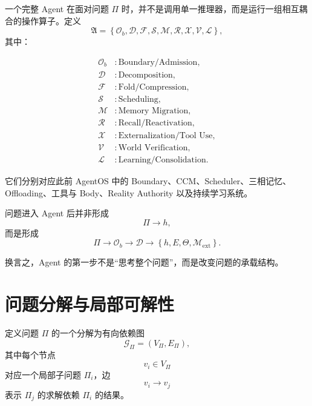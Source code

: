 一个完整 Agent 在面对问题 $\Pi$ 时，并不是调用单一推理器，而是运行一组相互耦合的操作算子。定义
\begin{equation}
\mathfrak A
=
\left\{
\mathcal O_b,
\mathcal D,
\mathcal F,
\mathcal S,
\mathcal M,
\mathcal R,
\mathcal X,
\mathcal V,
\mathcal L
\right\},
\end{equation}
其中：

\begin{align}
\mathcal O_b &: \text{Boundary/Admission},\\
\mathcal D &: \text{Decomposition},\\
\mathcal F &: \text{Fold/Compression},\\
\mathcal S &: \text{Scheduling},\\
\mathcal M &: \text{Memory Migration},\\
\mathcal R &: \text{Recall/Reactivation},\\
\mathcal X &: \text{Externalization/Tool Use},\\
\mathcal V &: \text{World Verification},\\
\mathcal L &: \text{Learning/Consolidation}.
\end{align}

它们分别对应此前 AgentOS 中的 Boundary、CCM、Scheduler、三相记忆、Offloading、工具与 Body、Reality Authority 以及持续学习系统。

问题进入 Agent 后并非形成
\begin{equation}
\Pi\rightarrow h,
\end{equation}
而是形成
\begin{equation}
\Pi
\rightarrow
\mathcal O_b
\rightarrow
\mathcal D
\rightarrow
\left\{
h,E,\Theta,\mathcal M_{\mathrm{ext}}
\right\}.
\end{equation}

换言之，Agent 的第一步不是“思考整个问题”，而是改变问题的承载结构。

\section{问题分解与局部可解性}

定义问题 $\Pi$ 的一个分解为有向依赖图
\begin{equation}
\mathcal G_\Pi
=
(V_\Pi,E_\Pi),
\end{equation}
其中每个节点
\begin{equation}
v_i\in V_\Pi
\end{equation}
对应一个局部子问题 $\Pi_i$，边
\begin{equation}
v_i\rightarrow v_j
\end{equation}
表示 $\Pi_j$ 的求解依赖 $\Pi_i$ 的结果。

